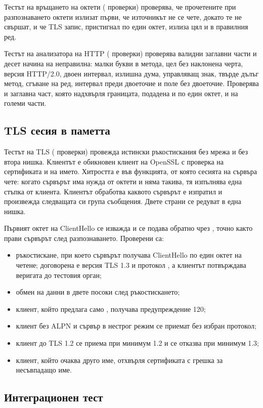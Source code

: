 Тестът на връщането на октети (\checksReplay{} проверки) проверява, че прочетените при
разпознаването октети излизат първи, че източникът не се чете, докато те не свършат, и
че TLS запис, пристигнал по един октет, излиза цял и в правилния ред.

Тестът на анализатора на HTTP (\checksHttp{} проверки) проверява валидни заглавни части
и десет начина на неправилна: малки букви в метода, цел без наклонена черта, версия
HTTP/2.0, двоен интервал, излишна дума, управляващ знак, твърде дълъг метод, сгъване на
ред, интервал преди двоеточие и поле без двоеточие. Проверява и заглавна част, която
надхвърля границата, подадена и по един октет, и на големи части.

\subsection{TLS сесия в паметта}

Тестът на TLS (\checksTls{} проверки) провежда истински ръкостискания без мрежа и без
втора нишка. Клиентът е обикновен клиент на OpenSSL с проверка на сертификата и на
името. Хитростта е във функцията, от която сесията на сървъра чете: когато сървърът има
нужда от октети и няма такива, тя изпълнява една стъпка от клиента. Клиентът обработва
каквото сървърът е изпратил и произвежда следващата си група съобщения. Двете страни се
редуват в една нишка.

Първият октет на ClientHello се изважда и се подава обратно чрез ,
точно както прави сървърът след разпознаването. Проверени са:
\begin{itemize}
\item ръкостискане, при което сървърът получава ClientHello по един октет на четене;
  договорена е версия TLS 1.3 и протокол , а клиентът потвърждава веригата
  до тестовия орган;
\item обмен на данни в двете посоки след ръкостискането;
\item клиент, който предлага само , получава предупреждение 120;
\item клиент без ALPN и сървър в нестрог режим се приемат без избран протокол;
\item клиент до TLS 1.2 се приема при минимум 1.2 и се отказва при минимум 1.3;
\item клиент, който очаква друго име, отхвърля сертификата с грешка за несъвпадащо име.
\end{itemize}

\subsection{Интеграционен тест}

